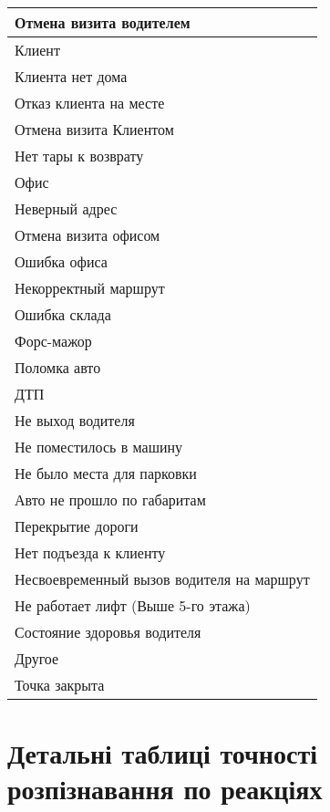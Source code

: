 \begin{longtable}[c]{ | p{16cm} | }
	\nopagebreak\quad Отмена визита водителем \\
	\hline
	Клиент \\
	\nopagebreak\quad Клиента нет дома \\
	\nopagebreak\quad Отказ клиента на месте \\
	\nopagebreak\quad Отмена визита Клиентом \\
	\nopagebreak\quad Нет тары к возврату \\
	\hline
	Офис \\
	\nopagebreak\quad Неверный адрес \\
	\nopagebreak\quad Отмена визита офисом \\
	\nopagebreak\quad Ошибка офиса  \\
	\hline
	Некорректный маршрут \\
	\hline
	Ошибка склада \\
	\hline
	Форс-мажор \\
	\nopagebreak\quad Поломка авто \\
	\nopagebreak\quad ДТП \\
	\nopagebreak\quad Не выход водителя \\
	\nopagebreak\quad Не поместилось в машину \\
	\nopagebreak\quad Не было места для парковки \\
	\nopagebreak\quad Авто не прошло по габаритам \\
	\nopagebreak\quad Перекрытие дороги \\
	\nopagebreak\quad Нет подъезда к клиенту \\
	\nopagebreak\quad Несвоевременный вызов водителя на маршрут \\
	\nopagebreak\quad Не работает лифт (Выше 5-го этажа) \\
	\hline
	Состояние здоровья водителя \\
	\hline
	Другое \\
	\hline
	Точка закрыта \\
\end{longtable}%


\chapter{Детальні таблиці точності розпізнавання по реакціях} \label{AppendixB}


